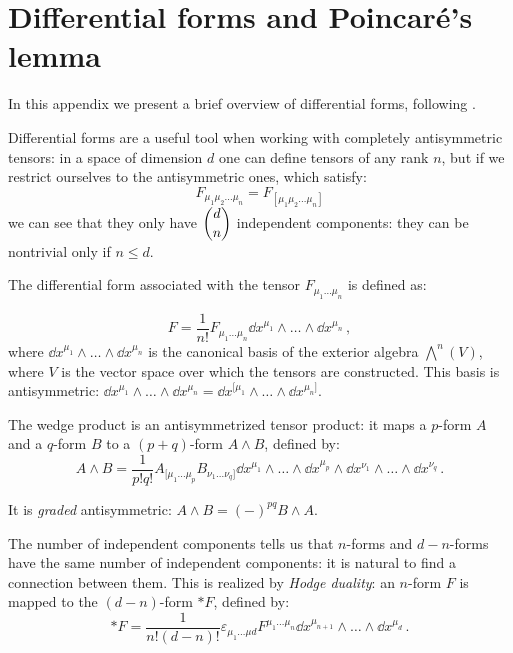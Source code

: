 \documentclass[main.tex]{subfiles}
\begin{document}
\appendix

\section{Differential forms and Poincaré's lemma} \label{sec:differential-forms}

In this appendix we present a brief overview of differential forms, following \cite{Lechner}.

Differential forms are a useful tool when working with completely antisymmetric tensors:
in a space of dimension \(d\) one can define tensors of any rank \(n\), but if we restrict ourselves to the antisymmetric ones, which satisfy:
%
\begin{equation}
  F_{\mu_1 \mu_2 \dots \mu_{n}} 
 = F_{[\mu_1 \mu_2 \dots \mu_{n}]}
\end{equation}
%
we can see that they only have \(\dbinom{d}{n}\) independent components: they can be nontrivial only if \(n \leq d\).  

The differential form associated with the tensor \(F_{\mu_1 \dots \mu_{n}}\) is defined as:

\begin{equation}
  F = \frac{1}{n!} F_{\mu_1 \dots \mu_{n}} \dd{x^{\mu_1}} \wedge \dots \wedge \dd{x^{\mu_n}}\,,
\end{equation}
%
where \(\dd{x^{\mu_1}} \wedge \dots \wedge \dd{x^{\mu_n}}\) is the canonical basis of the exterior algebra \(\bigwedge^n (V)\), where \(V\) is the vector space over which the tensors are constructed.
This basis is antisymmetric: \(\dd{x^{\mu_1}} \wedge \dots \wedge \dd{x^{\mu_n}} = \dd{x^{[\mu_1}} \wedge \dots \wedge \dd{x^{\mu_n]}}\).

The wedge product is an antisymmetrized tensor product: it maps a \(p\)-form \(A\) and a \(q\)-form \(B\) to a \((p+q)\)-form \(A \wedge B\), defined by:
\begin{equation}
  A \wedge B = \frac{1}{p!q!} 
  A_{[\mu_1 \dots \mu_{p}} B_{\nu_1 \dots \nu_{q}]}
  \dd{x^{\mu_1}} \wedge \dots \wedge \dd{x^{\mu_p}} \wedge
  \dd{x^{\nu_1}} \wedge \dots \wedge \dd{x^{\nu_q}}\,.
\end{equation}

It is \emph{graded} antisymmetric: \(A \wedge B = (-)^{pq} B \wedge A\).

The number of independent components tells us that \(n\)-forms and \(d-n\)-forms have the same number of independent components: it is natural to find a connection between them. This is realized by \emph{Hodge duality}: an \(n\)-form \(F\) is mapped to the \((d-n)\)-form \(*F\), defined by:
\begin{equation}
  *F = 
  \frac{1}{n!(d-n)!} \varepsilon_{\mu_1 \dots \mu d} F^{\mu_1 \dots \mu_n} \dd{x^{\mu_{n+1}}} \wedge \dots \wedge \dd{x^{\mu_{d}}}\,.
\end{equation}
\end{document}
